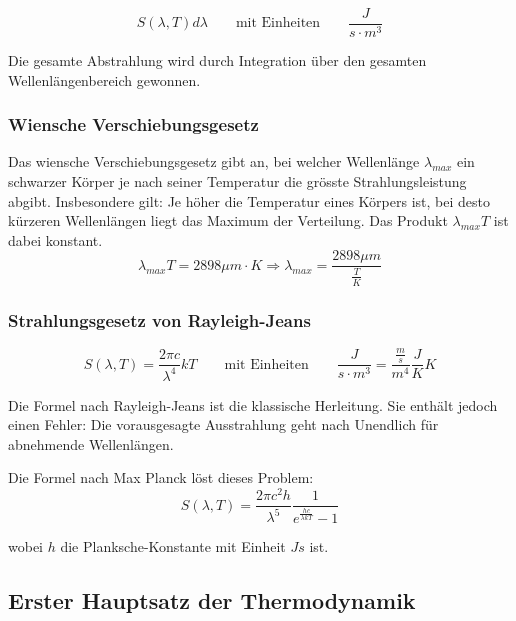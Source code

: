 \documentclass[11pt]{article}
\begin{document}
\begin{equation*}
	S(\lambda, T)d\lambda \qquad\text{mit Einheiten}\qquad \frac{J}{s \cdot m^3}
\end{equation*}

Die gesamte Abstrahlung wird durch Integration {\"u}ber den gesamten Wellenl{\"a}ngenbereich gewonnen. \newline

\subsubsection{Wiensche Verschiebungsgesetz}
Das wiensche Verschiebungsgesetz gibt an, bei welcher Wellenl{\"a}nge $\lambda_{max}$ ein schwarzer K{\"o}rper je nach seiner Temperatur die gr{\"o}sste Strahlungsleistung abgibt. Insbesondere gilt: Je h{\"o}her die Temperatur eines K{\"o}rpers ist, bei desto k{\"u}rzeren Wellenl{\"a}ngen liegt das Maximum der Verteilung. Das Produkt $\lambda_{max}T$ ist dabei konstant.
\begin{equation*}
	\lambda_{max}T = 2898\mu m \cdot K \Rightarrow \lambda_{max} = \frac{2898 \mu m}{\frac{T}{K}}
\end{equation*}

\subsubsection{Strahlungsgesetz von Rayleigh-Jeans}

\begin{equation*}
	S(\lambda, T) = \frac{2\pi c}{\lambda^4}kT \qquad\text{mit Einheiten}\qquad  \frac{J}{s \cdot m^3} = \frac{\frac{m}{s}}{m^4} \frac{J}{K} K
\end{equation*}

Die Formel nach Rayleigh-Jeans ist die klassische Herleitung. Sie enth{\"a}lt jedoch einen Fehler: Die vorausgesagte Ausstrahlung geht nach Unendlich f{\"u}r abnehmende Wellenl{\"a}ngen. \newline

Die Formel nach Max Planck l{\"o}st dieses Problem:
\begin{equation*}
	S(\lambda, T) = \frac{2\pi c^2 h}{\lambda^5}\frac{1}{e^{\frac{hc}{\lambda kT}}-1}
\end{equation*}

wobei $h$ die Planksche-Konstante mit Einheit $Js$ ist.

\subsection{Erster Hauptsatz der Thermodynamik}
\end{document}
